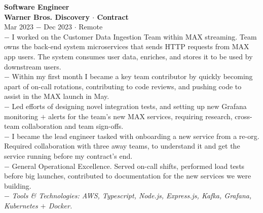 \documentclass{resume}
\begin{document}
\begin{flushleft}
\normalsize{\bf Software Engineer}\\
\footnotesize{\bf Warner Bros. Discovery $\cdot$ Contract}\\
\footnotesize{Mar 2023 $-$ Dec 2023 $\cdot$ Remote}\\[1mm]
{\scriptsize
	$-$ I worked on the Customer Data Ingestion Team within MAX streaming. Team owns the back-end system microservices that sends HTTP requests from MAX app users. The system consumes user data, enriches, and stores it to be used by downstream users.\\
	$-$ Within my first month I became a key team contributor by quickly becoming apart of on-call rotations, contributing to code reviews, and pushing code to assist in the MAX launch in May.\\
	$-$ Led efforts of designing novel integration tests, and setting up new Grafana monitoring $+$ alerts for the team's new MAX services, requiring research, cross-team collaboration and team sign-offs.\\
	$-$ I became the lead engineer tasked with onboarding a new service from a re-org. Required collaboration with three away teams, to understand it and get the service running before my contract's end.\\
	$-$ General Operational Excellence. Served on-call shifts, performed load tests before big launches, contributed to documentation for the new services we were building.\\
	$-$ \textit{Tools \& Technologies: AWS, Typescript, Node.js, Express.js, Kafka, Grafana, Kubernetes $+$ Docker.}
}\\[3mm]


\end{flushleft}
\end{document}
